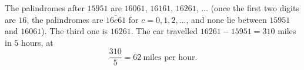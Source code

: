 The palindromes after $15951$ are $16061$, $16161$, $16261$, $\dots$ (once the first two digits are $16$, the palindromes are $\overline{16c61}$ for $c=0,1,2,\dots$, and none lie between $15951$ and $16061$). The third one is $16261$. The car travelled $16261-15951=310$ miles in $5$ hours, at
\[
\dfrac{310}{5}=\boxed{62}\ \text{miles per hour}.
\]
